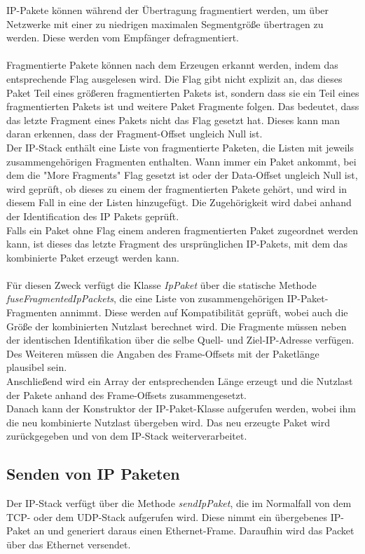 IP-Pakete können während der Übertragung fragmentiert werden, um über Netzwerke mit einer zu niedrigen maximalen Segmentgröße übertragen zu werden. Diese werden vom Empfänger defragmentiert. \\\\
Fragmentierte Pakete können nach dem Erzeugen erkannt werden, indem das entsprechende Flag ausgelesen wird. Die Flag gibt nicht explizit an, das dieses Paket Teil eines größeren fragmentierten Pakets ist, sondern dass sie ein Teil eines fragmentierten Pakets ist und weitere Paket Fragmente folgen. Das bedeutet, dass das letzte Fragment eines Pakets nicht das Flag gesetzt hat. Dieses kann man daran erkennen, dass der Fragment-Offset ungleich Null ist.\\
Der IP-Stack enthält eine Liste von fragmentierte Paketen, die Listen mit jeweils zusammengehörigen Fragmenten enthalten. Wann immer ein Paket ankommt, bei dem die {}"More Fragments"{} Flag gesetzt ist oder der Data-Offset ungleich Null ist, wird geprüft, ob dieses zu einem der fragmentierten Pakete gehört, und wird in diesem Fall in eine der Listen hinzugefügt. Die Zugehörigkeit wird dabei anhand der Identification des IP Pakets geprüft. \\
Falls ein Paket ohne Flag einem anderen fragmentierten Paket zugeordnet werden kann, ist dieses das letzte Fragment des ursprünglichen IP-Pakets, mit dem das kombinierte Paket erzeugt werden kann. \\\\
Für diesen Zweck verfügt die Klasse \textit{IpPaket} über die statische Methode \textit{fuseFragmentedIpPackets}, die eine Liste von zusammengehörigen IP-Paket-Fragmenten annimmt. Diese werden auf Kompatibilität geprüft, wobei auch die Größe der kombinierten Nutzlast berechnet wird. Die Fragmente müssen neben der identischen Identifikation über die selbe Quell- und Ziel-IP-Adresse verfügen. Des Weiteren müssen die Angaben des Frame-Offsets mit der Paketlänge plausibel sein. \\
Anschließend wird ein Array der entsprechenden Länge erzeugt und die Nutzlast der Pakete anhand des Frame-Offsets zusammengesetzt. \\Danach kann der Konstruktor der IP-Paket-Klasse aufgerufen werden, wobei ihm die neu kombinierte Nutzlast übergeben wird. Das neu erzeugte Paket wird zurückgegeben und von dem IP-Stack weiterverarbeitet. 


\subsection{Senden von IP Paketen}
Der IP-Stack verfügt über die Methode \textit{sendIpPaket}, die im Normalfall von dem TCP- oder dem UDP-Stack aufgerufen wird. Diese nimmt ein übergebenes IP-Paket an und generiert daraus einen Ethernet-Frame. Daraufhin wird das Packet über das Ethernet versendet. 



